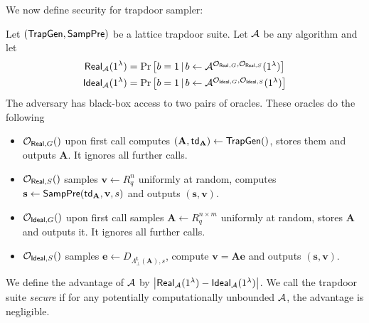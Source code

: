 We now define security for  trapdoor sampler:
\begin{definition}
    Let $(\mathsf{TrapGen},\mathsf{SampPre})$ be a lattice trapdoor suite. 
Let $\mathcal{A}$ be any algorithm and let
    \begin{equation*}
        \begin{aligned}
            \Real_{\adversary}(\SecParam) &= \Pr%
            \begin{bmatrix}
               b=1 \, | \, b \gets \adversary^{\mathcal{O}_{\Real,G},\mathcal{O}_{\Real,S}}(\SecParam)
                     \end{bmatrix} \\
            \Ideal_{\adversary}(\SecParam) &= \Pr%
            \begin{bmatrix}
               b=1 \, | \, b \gets \adversary^{\mathcal{O}_{\Ideal,G},\mathcal{O}_{\Ideal,S}}(\SecParam)
            \end{bmatrix}
        \end{aligned}
    \end{equation*}
    The adversary has black-box access to two pairs of oracles. These oracles do the following
    \begin{itemize}
        \item $\mathcal{O}_{\mathsf{Real},G}()$ upon first call computes $(\mathbf{A},\mathsf{td}_\mathbf{A})\gets \mathsf{TrapGen}()$, stores them and outputs $\mathbf{A}$. It ignores all further calls.
        \item $\mathcal{O}_{\Real,S}()$ samples $\mathbf{v}\gets R_q^n$ uniformly at random, computes $\mathbf{s}\gets \mathsf{SampPre}(\mathsf{td}_\mathbf{A},\mathbf{v},s)$ and outputs $(\mathbf{s},\mathbf{v})$.
                \item $\mathcal{O}_{\mathsf{Ideal},G}()$ upon first call samples $\mathbf{A}\gets R_q^{n\times m}$ uniformly at random, stores $\mathbf{A}$ and outputs it. It ignores all further calls.
        \item $\mathcal{O}_{\mathsf{Ideal},S}()$ samples $\mathbf{e}\gets D_{\Lambda_\bot^\mathbf{t}(\mathbf{A}),s}$, compute $\mathbf{v}= \mathbf{A}\mathbf{e}$ and outputs $(\mathbf{s},\mathbf{v})$.
    \end{itemize}
       
    We define the advantage of $\mathcal{A}$ by $ \left|\mathsf{Real}_{\mathcal{A}}(1^\lambda) - \mathsf{Ideal}_{\mathcal{A}}(1^\lambda)\right|$.
    We call the trapdoor suite \emph{secure} if for any potentially computationally unbounded $\mathcal{A}$, the advantage is negligible.

\end{definition}


